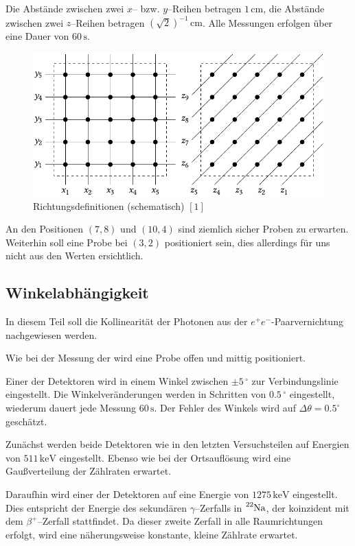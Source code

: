 \documentclass[12pt,a4paper]{scrartcl}
\numberwithin{equation}{section} %
\newcommand{\pu}[1]{\ensuremath{\mathrm{#1}}}
\begin{document}
Die Abstände zwischen zwei $x$-- bzw. $y$--Reihen betragen $\pu{1\,cm}$, die Abstände zwischen zwei $z$--Reihen betragen $(\sqrt{2})^{-1}\,\mathrm{cm}$. Alle Messungen erfolgen über eine Dauer von $60\,\mathrm{s}$.

\begin{figure}[h]
	\centering
	\includegraphics{../media/B3.4/Box_Axis.pdf}
	\caption{Richtungsdefinitionen (schematisch) $[1]$}
	\label{abb:TruheRichtungen}
\end{figure}

An den Positionen $(7,8)$ und $(10,4)$ sind ziemlich sicher Proben zu erwarten. Weiterhin soll eine Probe bei $(3, 2)$ positioniert sein, dies allerdings für uns nicht aus den Werten ersichtlich.

\subsection{Winkelabhängigkeit}
In diesem Teil soll die Kollinearität der Photonen aus der $e^+e^-$-Paarvernichtung nachgewiesen werden.

Wie bei der Messung der  wird eine Probe offen und mittig positioniert.

Einer der Detektoren wird in einem Winkel zwischen $\pm 5\,^\circ$ zur Verbindungslinie eingestellt. Die Winkelveränderungen werden in Schritten von $0.5\,^\circ$ eingestellt, wiederum dauert jede Messung $60\,\mathrm{s}$. Der Fehler des Winkels wird auf $\Delta \theta = \pu{0.5^\circ}$ geschätzt.

Zunächst werden beide Detektoren wie in den letzten Versuchsteilen auf Energien von $\pu{511\,keV}$ eingestellt. Ebenso wie bei der Ortsauflösung wird eine Gaußverteilung der Zählraten erwartet.

Daraufhin wird einer der Detektoren auf eine Energie von $\pu{1275\,keV}$ eingestellt. Dies entspricht der Energie des sekundären $\gamma$--Zerfalls in $\ce{^{22}Na}$, der koinzident mit dem $\beta^+$--Zerfall stattfindet. Da dieser zweite Zerfall in alle Raumrichtungen erfolgt, wird eine näherungsweise konstante, kleine Zählrate erwartet.
\end{document}
